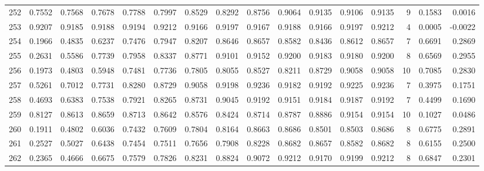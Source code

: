 \begin{tabular}{lrrrrrrrrrrrrrrr}
252 &      0.7552 &  0.7568 &  0.7678 &  0.7788 &  0.7997 &  0.8529 &  0.8292 &  0.8756 &  0.9064 &  0.9135 &   0.9106 &     0.9135 &      9 &                    0.1583 &                     0.0016 \\
253 &      0.9207 &  0.9185 &  0.9188 &  0.9194 &  0.9212 &  0.9166 &  0.9197 &  0.9167 &  0.9188 &  0.9166 &   0.9197 &     0.9212 &      4 &                    0.0005 &                    -0.0022 \\
254 &      0.1966 &  0.4835 &  0.6237 &  0.7476 &  0.7947 &  0.8207 &  0.8646 &  0.8657 &  0.8582 &  0.8436 &   0.8612 &     0.8657 &      7 &                    0.6691 &                     0.2869 \\
255 &      0.2631 &  0.5586 &  0.7739 &  0.7958 &  0.8337 &  0.8771 &  0.9101 &  0.9152 &  0.9200 &  0.9183 &   0.9180 &     0.9200 &      8 &                    0.6569 &                     0.2955 \\
256 &      0.1973 &  0.4803 &  0.5948 &  0.7481 &  0.7736 &  0.7805 &  0.8055 &  0.8527 &  0.8211 &  0.8729 &   0.9058 &     0.9058 &     10 &                    0.7085 &                     0.2830 \\
257 &      0.5261 &  0.7012 &  0.7731 &  0.8280 &  0.8729 &  0.9058 &  0.9198 &  0.9236 &  0.9182 &  0.9192 &   0.9225 &     0.9236 &      7 &                    0.3975 &                     0.1751 \\
258 &      0.4693 &  0.6383 &  0.7538 &  0.7921 &  0.8265 &  0.8731 &  0.9045 &  0.9192 &  0.9151 &  0.9184 &   0.9187 &     0.9192 &      7 &                    0.4499 &                     0.1690 \\
259 &      0.8127 &  0.8613 &  0.8659 &  0.8713 &  0.8642 &  0.8576 &  0.8424 &  0.8714 &  0.8787 &  0.8886 &   0.9154 &     0.9154 &     10 &                    0.1027 &                     0.0486 \\
260 &      0.1911 &  0.4802 &  0.6036 &  0.7432 &  0.7609 &  0.7804 &  0.8164 &  0.8663 &  0.8686 &  0.8501 &   0.8503 &     0.8686 &      8 &                    0.6775 &                     0.2891 \\
261 &      0.2527 &  0.5027 &  0.6438 &  0.7454 &  0.7511 &  0.7656 &  0.7908 &  0.8228 &  0.8682 &  0.8657 &   0.8582 &     0.8682 &      8 &                    0.6155 &                     0.2500 \\
262 &      0.2365 &  0.4666 &  0.6675 &  0.7579 &  0.7826 &  0.8231 &  0.8824 &  0.9072 &  0.9212 &  0.9170 &   0.9199 &     0.9212 &      8 &                    0.6847 &                     0.2301 \\

\end{tabular}
